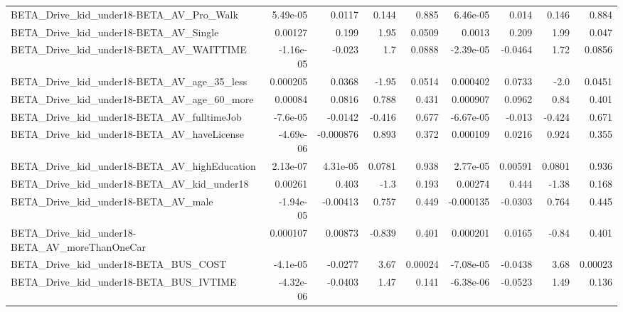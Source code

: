 \begin{tabular}{lrrrrrrrr}
BETA\_Drive\_kid\_under18-BETA\_AV\_Pro\_Walk            &    5.49e-05 &       0.0117 &    0.144 &    0.885 &   6.46e-05 &       0.014 &        0.146 &         0.884 \\
BETA\_Drive\_kid\_under18-BETA\_AV\_Single              &     0.00127 &        0.199 &     1.95 &   0.0509 &     0.0013 &       0.209 &         1.99 &         0.047 \\
BETA\_Drive\_kid\_under18-BETA\_AV\_WAITTIME            &   -1.16e-05 &       -0.023 &      1.7 &   0.0888 &  -2.39e-05 &     -0.0464 &         1.72 &        0.0856 \\
BETA\_Drive\_kid\_under18-BETA\_AV\_age\_35\_less         &    0.000205 &       0.0368 &    -1.95 &   0.0514 &   0.000402 &      0.0733 &         -2.0 &        0.0451 \\
BETA\_Drive\_kid\_under18-BETA\_AV\_age\_60\_more         &     0.00084 &       0.0816 &    0.788 &    0.431 &   0.000907 &      0.0962 &         0.84 &         0.401 \\
BETA\_Drive\_kid\_under18-BETA\_AV\_fulltimeJob         &    -7.6e-05 &      -0.0142 &   -0.416 &    0.677 &  -6.67e-05 &      -0.013 &       -0.424 &         0.671 \\
BETA\_Drive\_kid\_under18-BETA\_AV\_haveLicense         &   -4.69e-06 &    -0.000876 &    0.893 &    0.372 &   0.000109 &      0.0216 &        0.924 &         0.355 \\
BETA\_Drive\_kid\_under18-BETA\_AV\_highEducation       &    2.13e-07 &     4.31e-05 &   0.0781 &    0.938 &   2.77e-05 &     0.00591 &       0.0801 &         0.936 \\
BETA\_Drive\_kid\_under18-BETA\_AV\_kid\_under18         &     0.00261 &        0.403 &     -1.3 &    0.193 &    0.00274 &       0.444 &        -1.38 &         0.168 \\
BETA\_Drive\_kid\_under18-BETA\_AV\_male                &   -1.94e-05 &     -0.00413 &    0.757 &    0.449 &  -0.000135 &     -0.0303 &        0.764 &         0.445 \\
BETA\_Drive\_kid\_under18-BETA\_AV\_moreThanOneCar      &    0.000107 &      0.00873 &   -0.839 &    0.401 &   0.000201 &      0.0165 &        -0.84 &         0.401 \\
BETA\_Drive\_kid\_under18-BETA\_BUS\_COST               &    -4.1e-05 &      -0.0277 &     3.67 &  0.00024 &  -7.08e-05 &     -0.0438 &         3.68 &       0.00023 \\
BETA\_Drive\_kid\_under18-BETA\_BUS\_IVTIME             &   -4.32e-06 &      -0.0403 &     1.47 &    0.141 &  -6.38e-06 &     -0.0523 &         1.49 &         0.136 \\

\end{tabular}
